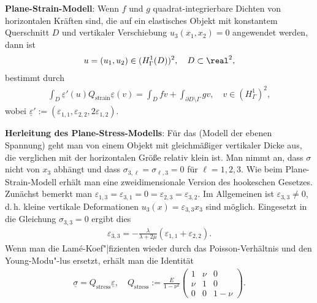 \linie

\textbf{Plane-Strain-Modell}:
Wenn $f$ und $g$ quadrat-integrierbare Dichten von horizontalen Kräften sind,
die auf ein elastisches Objekt mit konstantem Querschnitt $D$ und vertikaler Verschiebung
$u_3(x_1, x_2) = 0$ angewendet werden,
dann ist
\begin{align*}
    u = (u_1, u_2) \in (H_\Gamma^1(D))^2,\quad
    D \subset \real^2,
\end{align*}
bestimmt durch
\begin{align*}
    \int_D \underline{\varepsilon}'(u) Q_{\text{strain}} \underline{\varepsilon}(v)
    = \int_D fv + \int_{\partial D \setminus \Gamma} gv,\quad
    v \in (H_\Gamma^1)^2,
\end{align*}
wobei $\underline{\varepsilon}' := (\varepsilon_{1,1}, \varepsilon_{2,2}, 2\varepsilon_{1,2})$.

\linie
\pagebreak

\textbf{Herleitung des Plane-Stress-Modells}:
Für das  (Modell der ebenen Spannung) geht man von einem Objekt mit
gleichmäßiger vertikaler Dicke aus, die verglichen mit der horizontalen Größe relativ klein ist.
Man nimmt an, dass $\sigma$ nicht von $x_3$ abhängt und dass
$\sigma_{3,\ell} = \sigma_{\ell,3} = 0$ für $\ell = 1, 2, 3$.
Wie beim Plane-Strain-Modell erhält man eine zweidimensionale Version des hookeschen Gesetzes.
Zunächst bemerkt man
$\varepsilon_{1,3} = \varepsilon_{3,1} = 0 = \varepsilon_{2,3} = \varepsilon_{3,2}$.
Im Allgemeinen ist $\varepsilon_{3,3} \not= 0$, d.\,h. kleine vertikale Deformationen
$u_3(x) = \varepsilon_{3,3} x_3$ sind möglich.
Eingesetzt in die Gleichung $\sigma_{3,3} = 0$ ergibt dies
\begin{align*}
    \varepsilon_{3,3} = -\frac{\lambda}{\lambda + 2\mu} (\varepsilon_{1,1} + \varepsilon_{2,2}).
\end{align*}
Wenn man die Lamé-Koef"|fizienten wieder durch das Poisson-Verhältnis und den Young-Modu"-lus
ersetzt, erhält man die Identität
\begin{align*}
    \underline{\sigma} = Q_{\text{stress}} \underline{\varepsilon},\quad
    Q_{\text{stress}} := \frac{E}{1 - \nu^2} \begin{pmatrix}
    1&\nu&0\\\nu&1&0\\0&0&1-\nu\end{pmatrix}.
\end{align*}

\linie

